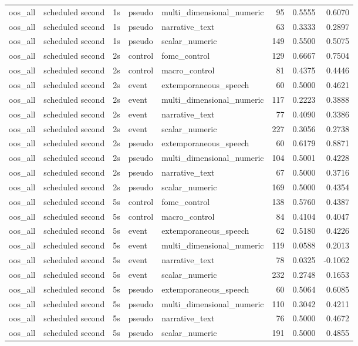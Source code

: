 \begin{tabular}{lllllrrr}
oos_all & scheduled second & 1s & pseudo & multi_dimensional_numeric & 95 & 0.5555 & 0.6070 \\
oos_all & scheduled second & 1s & pseudo & narrative_text & 63 & 0.3333 & 0.2897 \\
oos_all & scheduled second & 1s & pseudo & scalar_numeric & 149 & 0.5500 & 0.5075 \\
oos_all & scheduled second & 2s & control & fomc_control & 129 & 0.6667 & 0.7504 \\
oos_all & scheduled second & 2s & control & macro_control & 81 & 0.4375 & 0.4446 \\
oos_all & scheduled second & 2s & event & extemporaneous_speech & 60 & 0.5000 & 0.4621 \\
oos_all & scheduled second & 2s & event & multi_dimensional_numeric & 117 & 0.2223 & 0.3888 \\
oos_all & scheduled second & 2s & event & narrative_text & 77 & 0.4090 & 0.3386 \\
oos_all & scheduled second & 2s & event & scalar_numeric & 227 & 0.3056 & 0.2738 \\
oos_all & scheduled second & 2s & pseudo & extemporaneous_speech & 60 & 0.6179 & 0.8871 \\
oos_all & scheduled second & 2s & pseudo & multi_dimensional_numeric & 104 & 0.5001 & 0.4228 \\
oos_all & scheduled second & 2s & pseudo & narrative_text & 67 & 0.5000 & 0.3716 \\
oos_all & scheduled second & 2s & pseudo & scalar_numeric & 169 & 0.5000 & 0.4354 \\
oos_all & scheduled second & 5s & control & fomc_control & 138 & 0.5760 & 0.4387 \\
oos_all & scheduled second & 5s & control & macro_control & 84 & 0.4104 & 0.4047 \\
oos_all & scheduled second & 5s & event & extemporaneous_speech & 62 & 0.5180 & 0.4226 \\
oos_all & scheduled second & 5s & event & multi_dimensional_numeric & 119 & 0.0588 & 0.2013 \\
oos_all & scheduled second & 5s & event & narrative_text & 78 & 0.0325 & -0.1062 \\
oos_all & scheduled second & 5s & event & scalar_numeric & 232 & 0.2748 & 0.1653 \\
oos_all & scheduled second & 5s & pseudo & extemporaneous_speech & 60 & 0.5064 & 0.6085 \\
oos_all & scheduled second & 5s & pseudo & multi_dimensional_numeric & 110 & 0.3042 & 0.4211 \\
oos_all & scheduled second & 5s & pseudo & narrative_text & 76 & 0.5000 & 0.4672 \\
oos_all & scheduled second & 5s & pseudo & scalar_numeric & 191 & 0.5000 & 0.4855 \\
\bottomrule
\end{tabular}
